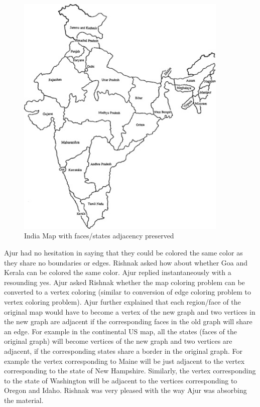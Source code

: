 \begin{figure}
\begin{center}
\includegraphics[width=0.9\textwidth]{MapIndia.jpg}
\end{center}
\caption{India Map with faces/states adjacency preserved}\label{10g10}
\end{figure}

Ajur had no hesitation in saying that they could be colored the same color as they share no boundaries or edges. Rishnak asked how about whether Goa and Kerala can be colored the same color. Ajur replied instantaneously with a resounding yes. Ajur asked Rishnak whether the map coloring problem can be converted to a vertex coloring (similar to conversion of edge coloring problem to vertex coloring problem). Ajur further explained that each region/face of the original map would have to become a vertex of the new graph and two vertices in the new graph are adjacent if the corresponding faces in the old graph will share an edge. For example in the continental US map, all the states (faces of the original graph) will become vertices of the new graph and two vertices are adjacent, if the corresponding states share a border in the original graph. For example the vertex corresponding to Maine will be just adjacent to the vertex corresponding to the state of New Hampshire. Similarly, the vertex corresponding to the state of Washington will be adjacent to the vertices corresponding to Oregon and Idaho. Rishnak was very pleased with the way Ajur was absorbing the material. 

